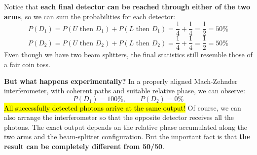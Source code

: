 \begin{figure}[H]
\end{figure}

\noindent
Notice that \textbf{each final detector can be reached through either of the two arms}, so we can sum the probabilities for each detector:
\begin{equation*}
    P(D_1) = P(U\text{ then }D_1) + P(L\text{ then }D_1) = \frac{1}{4} + \frac{1}{4} = \frac{1}{2} = 50\%
\end{equation*}
\begin{equation*}
    P(D_2) = P(U\text{ then }D_2) + P(L\text{ then }D_2) = \frac{1}{4} + \frac{1}{4} = \frac{1}{2} = 50\%
\end{equation*}
Even though we have two beam splitters, the final statistics still resemble those of a fair coin toss.

\highspace
\textcolor{Red2}{ \textbf{But what happens experimentally?}} In a properly aligned Mach-Zehnder interferometer, with coherent paths and suitable relative phase, we can observe:
\begin{equation*}
    P(D_1)=100\%,
    \qquad
    P(D_2)=0\%
\end{equation*}
\hl{All successfully detected photons arrive at the same output!} Of course, we can also arrange the interferometer so that the opposite detector receives all the photons. The exact output depends on the relative phase accumulated along the two arms and the beam-splitter configuration. But the important fact is that \textbf{the result can be completely different from 50/50}.

